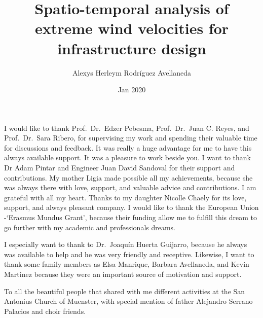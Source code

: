 \documentclass[12pt,oneside]{reedthesis}
\title{Spatio-temporal analysis of extreme wind velocities for infrastructure design}
\author{Alexys Herleym Rodríguez Avellaneda}
\date{Jan 2020}
\begin{document}
  \maketitle

\frontmatter %
\pagestyle{empty} %
  \begin{acknowledgements}
    I would like to thank Prof.~Dr.~Edzer Pebesma, Prof.~Dr.~Juan C. Reyes, and Prof.~Dr.~Sara Ribero, for supervising my work and spending their valuable time for discussions and feedback. It was really a huge advantage for me to have this always available support. It was a pleasure to work beside you. I want to thank Dr Adam Pintar and Engineer Juan David Sandoval for their support and contributions. My mother Ligia made possible all my achievements, because she was always there with love, support, and valuable advice and contributions. I am grateful with all my heart. Thanks to my daughter Nicolle Chaely for its love, support, and always pleasant company. I would like to thank the European Union -`Erasmus Mundus Grant', because their funding allow me to fulfill this dream to go further with my academic and professionals dreams.
    
    \par
    
    I especially want to thank to Dr.~Joaquín Huerta Guijarro, because he always was available to help and he was very friendly and receptive. Likewise, I want to thank some family members as Elsa Manrique, Barbara Avellaneda, and Kevin Martinez because they were an important source of motivation and support.
    
    \par
    
    To all the beautiful people that shared with me different activities at the San Antonius Church of Muenster, with special mention of father Alejandro Serrano Palacios and choir friends.
  \end{acknowledgements}
\end{document}
